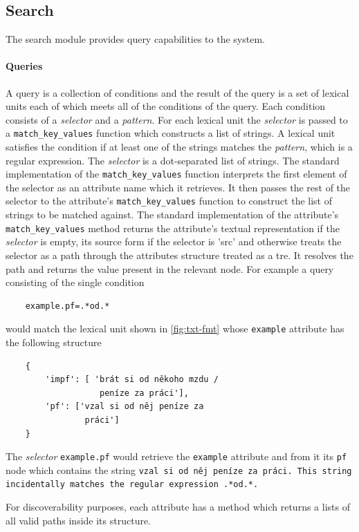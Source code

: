 \documentclass[10pt, a4paper, twocolumn]{article} %
\newcommand{\py}[1]{{\tt #1}}
\newcommand{\att}[1]{{\tt #1}}
\begin{document}
\subsection{Search}
The search module provides query capabilities to the system.

\paragraph{Queries} A query is a collection of conditions
and the result of the query is a set of lexical units each of which meets all
of the conditions of the query. Each condition consists of a \emph{selector} and a
\emph{pattern}. For each lexical unit the \emph{selector} is passed to a \py{match\_key\_values}
function which constructs a list of strings. A lexical unit satisfies the condition if at
least one of the strings matches the \emph{pattern}, which is a regular expression.
The \emph{selector} is a dot-separated list of strings. The standard implementation of the
\py{match\_key\_values} function interprets the first element of the selector as an attribute
name which it retrieves. It then passes the rest of the selector to the attribute's \py{match\_key\_values}
function to construct the list of strings to be matched against. The standard implementation
of the attribute's \py{match\_key\_values} method returns the attribute's textual representation
if the \emph{selector} is empty, its source form if the selector is 'src' and otherwise treats
the selector as a path through the attributes structure treated as a tre. It resolves the path and returns the
value present in the relevant node. For example a query consisting of the single condition
\begin{verbatim}
    example.pf=.*od.*
\end{verbatim}
would match the lexical unit shown in \autoref{fig:txt-fmt} whose \att{example} attribute
has the following structure
\begin{verbatim}
    {
        'impf': [ 'brát si od někoho mzdu /
                   peníze za práci'],
        'pf': ['vzal si od něj peníze za
                práci']
    }
\end{verbatim}
The \emph{selector} \att{example.pf} would retrieve the \att{example} attribute and from it
its \att{pf} node which contains the string \tt{vzal si od něj peníze za práci}. This string
incidentally matches the regular expression \tt{.*od.*}.

For discoverability purposes, each attribute has a method which returns a lists of all valid paths
inside its structure.
\end{document}
